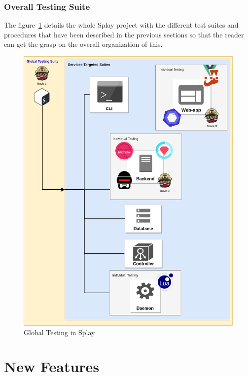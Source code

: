 \documentclass{eplmastersthesis}
\begin{document}
      \subsection{Overall Testing Suite}

        The figure~\ref{global_testing} details the whole Splay project with the different
        test suites and procedures that have been described in the previous
        sections so that the reader can get the grasp on the overall
        organization of this.

        \begin{figure}[H]
          \centering
          \includegraphics[scale=0.55]{figures/global_testing.png}
          \caption{\label{global_testing} Global Testing in Splay}
        \end{figure}

    \chapter{New Features}
\end{document}
